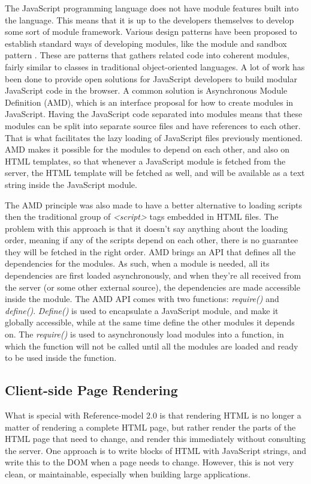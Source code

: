 The JavaScript programming language does not have module features built into the language. This means that it is up to the developers themselves to develop some sort of module framework. Various design patterns have been proposed to establish standard ways of developing modules, like the module and sandbox pattern \cite{jspatterns}. These are patterns that gathers related code into coherent modules, fairly similar to classes in traditional object-oriented languages. A lot of work has been done to provide open solutions for JavaScript developers to build modular JavaScript code in the browser. A common solution is Asynchronous Module Definition (AMD)\cite{amd}, which is an interface proposal for how to create modules in JavaScript. Having the JavaScript code separated into modules means that these modules can be split into separate source files and have references to each other. That is what facilitates the lazy loading of JavaScript files previously mentioned.
AMD makes it possible for the modules to depend on each other, and also on HTML templates, so that whenever a JavaScript module is fetched from the server, the HTML template will be fetched as well, and will be available as a text string inside the JavaScript module.
	
The AMD principle was also made to have a better alternative to loading scripts then the traditional group of \textit{<script>} tags embedded in HTML files. The problem with this approach is that it doesn't say anything about the loading order, meaning if any of the scripts depend on each other, there is no guarantee they will be fetched in the right order. AMD brings an API that defines all the dependencies for the modules. As such, when a module is needed, all its dependencies are first loaded asynchronously, and when they're all received from the server (or some other external source), the dependencies are made accessible inside the module. The AMD API comes with two functions: \textit{require()} and \textit{define()}. \textit{Define()} is used to encapsulate a JavaScript module, and make it globally accessible, while at the same time define the other modules it depends on. The \textit{require()} is used to asynchronously load modules into a function, in which the function will not be called until all the modules are loaded and ready to be used inside the function.


\subsection{Client-side Page Rendering}
What is special with Reference-model 2.0 is that rendering HTML is no longer a matter of rendering a complete HTML page, but rather render the parts of the HTML page that need to change, and render this immediately without consulting the server. One approach is to write blocks of HTML with JavaScript strings, and write this to the DOM when a page needs to change. However, this is not very clean, or maintainable, especially when building large applications.

